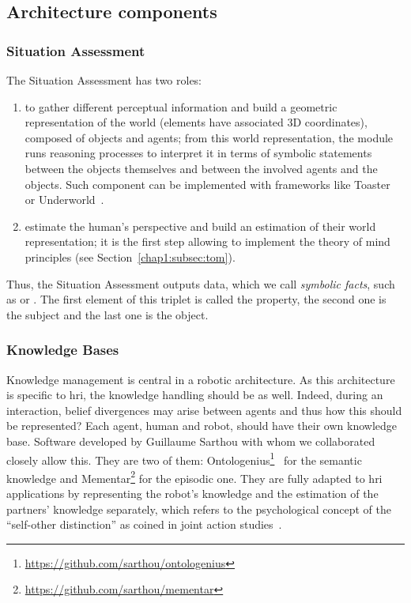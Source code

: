 \documentclass[a4paper,11pt,twoside]{StyleThese}
\begin{document}
\subsection{Architecture components}

\subsubsection{Situation Assessment}
The Situation Assessment has two roles:
\begin{enumerate}
	\item  to gather different perceptual information and build a geometric representation of the world (\ie elements have associated 3D coordinates), composed of objects and agents; from this world representation, the module runs reasoning processes to interpret it in terms of symbolic statements between the objects themselves and between the involved agents and the objects. Such component can be implemented with frameworks like Toaster~\cite{milliez_2014_framework} or Underworld~\cite{lemaignan_2018_underworlds}.
	\item estimate the human's perspective and build an estimation of their world representation; it is the first step allowing to implement the theory of mind principles (see Section~\ref{chap1:subsec:tom}).
\end{enumerate}

Thus, the Situation Assessment outputs data, which we call \textit{symbolic facts}, such as  or . The first element of this triplet is called the property, the second one is the subject and the last one is the object.

\subsubsection{Knowledge Bases}\label{chap3:subsubsec:kb}

Knowledge management is central in a robotic architecture. As this architecture is specific to \acrshort{hri}, the knowledge handling should be as well. Indeed, during an interaction, belief divergences may arise between agents and thus how this should be represented? Each agent, human and robot, should have their own knowledge base. Software developed by Guillaume Sarthou with whom we collaborated closely allow this. They are two of them: Ontologenius\footnote{\url{https://github.com/sarthou/ontologenius}}~\cite{sarthou_2019_ontologenius} for the semantic knowledge and Mementar\footnote{\url{https://github.com/sarthou/mementar}} for the episodic one. They are fully adapted to \acrshort{hri} applications by representing the robot's knowledge and the estimation of the partners' knowledge separately, which refers to the psychological concept of the ``self-other distinction'' as coined in joint action studies~\cite{pacherie_2012_agency}.  
\end{document}
